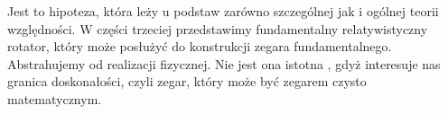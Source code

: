Jest to hipoteza, która leży u podstaw zarówno 
szczególnej jak i ogólnej teorii względności. 
W części trzeciej przedstawimy fundamentalny 
relatywistyczny rotator, który może posłużyć do konstrukcji zegara 
fundamentalnego. Abstrahujemy od realizacji fizycznej. 
Nie jest ona istotna , gdyż interesuje nas granica doskonałości, 
czyli zegar, który może być
zegarem czysto matematycznym.  




